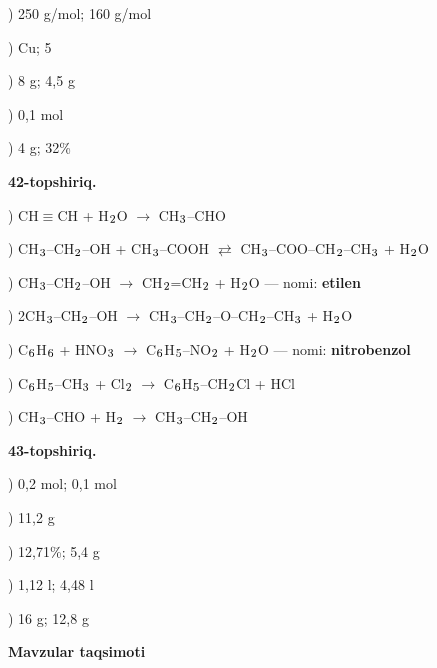 \documentclass[11pt,a4paper]{article}
\renewcommand{\textsubscript}[1]{\ensuremath{_{\text{\fontsize{8}{8}\selectfont #1}}}}
\begin{document}
) 250 g/mol; 160 g/mol\par
{}) Cu; 5\par
{}) 8 g; 4,5 g\par
{}) 0,1 mol\par
{}) 4 g; 32\%\par
\noindent\textbf{42-topshiriq.}\par
{}) CH$\equiv$CH + H\textsubscript{2}O $\to$ CH\textsubscript{3}--CHO\par
{}) CH\textsubscript{3}--CH\textsubscript{2}--OH + CH\textsubscript{3}--COOH $\rightleftarrows$ CH\textsubscript{3}--COO--CH\textsubscript{2}--CH\textsubscript{3} + H\textsubscript{2}O\par
{}) CH\textsubscript{3}--CH\textsubscript{2}--OH $\to$ CH\textsubscript{2}=CH\textsubscript{2} + H\textsubscript{2}O --- nomi: \textbf{etilen}\par
{}) 2CH\textsubscript{3}--CH\textsubscript{2}--OH $\to$ CH\textsubscript{3}--CH\textsubscript{2}--O--CH\textsubscript{2}--CH\textsubscript{3} + H\textsubscript{2}O\par
{}) C\textsubscript{6}H\textsubscript{6} + HNO\textsubscript{3} $\to$ C\textsubscript{6}H\textsubscript{5}--NO\textsubscript{2} + H\textsubscript{2}O --- nomi: \textbf{nitrobenzol}\par
{}) C\textsubscript{6}H\textsubscript{5}--CH\textsubscript{3} + Cl\textsubscript{2} $\to$ C\textsubscript{6}H\textsubscript{5}--CH\textsubscript{2}Cl + HCl\par
{}) CH\textsubscript{3}--CHO + H\textsubscript{2} $\to$ CH\textsubscript{3}--CH\textsubscript{2}--OH\par
\noindent\textbf{43-topshiriq.}\par
{}) 0,2 mol; 0,1 mol\par
{}) 11,2 g\par
{}) 12,71\%; 5,4 g\par
{}) 1,12 l; 4,48 l\par
{}) 16 g; 12,8 g\par
\par\bigskip\noindent\textbf{Mavzular taqsimoti}\par\smallskip
\end{document}
